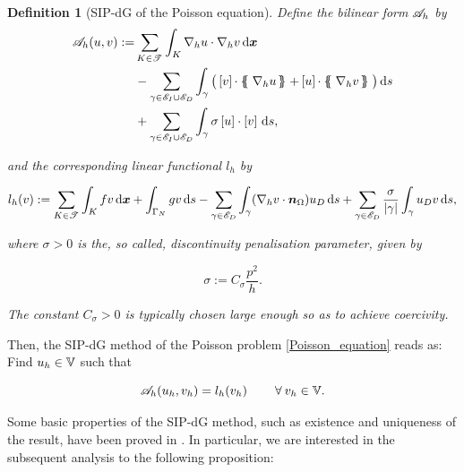 \documentclass[a4paper,11pt]{article}
\newtheorem{definition}{Definition}[section]
\begin{document}
\begin{definition}[SIP-dG of the Poisson equation] \label{def:SIPG}
Define the bilinear form $\mathscr A_{h}$ by
\begin{equation}
\begin{split}
  \cA_{h}(u,v) := &\sum_{K \in \T{}} \int_{K} \nabla_{h} u \cdot \nabla_{h} v \d \vec{x} \\
  & - \sum_{\gamma \in \cE_{I}\cup \cE_{D}}\int_{\gamma} \big( \jump{v} \cdot \avg{\nabla_{h}u} + \jump{u} \cdot \avg{\nabla_{h}v} \big) \d s  \\  
  & + \sum_{\gamma \in \cE_{I}\cup \cE_{D}} \int_{\gamma} \sigma \jump{u} \cdot \jump{v} \d s,
\end{split}
\label{bilinear_form_discrete}
\end{equation}

and the corresponding linear functional $l_{h}$ by

\begin{equation}
    l_{h}(v) := \sum_{K \in \mathscr T^{}} \int_{K} f v \,\mathrm{d} \boldsymbol x + \int_{\Gamma_{N}}gv \,\mathrm{d} s - \sum_{\gamma \in \mathscr E_{D}}\int_{\gamma} (\nabla_{h}v \cdot \boldsymbol n_{\Omega}) u_{D} \,\mathrm{d} s + \sum_{\gamma \in \mathscr E_{D}} \frac{\sigma}{|\gamma|} \int_{\gamma} u_{D} v \,\mathrm{d} s,
\end{equation}

where $\sigma > 0$ is the, so called, \textit{discontinuity penalisation parameter}, given by

\begin{equation}
    \sigma := C_{\sigma} \frac{p^{2}}{h}.
\end{equation}

The constant $C_{\sigma} > 0$ is typically chosen large enough so as to achieve coercivity.

\end{definition}

Then, the SIP-dG method of the Poisson problem \eqref{Poisson_equation} reads as: Find $u_{h} \in \mathbb V$ such that

\begin{equation}
    \mathscr A_{h}(u_{h},v_{h}) = l_{h}(v_{h}) \quad \quad\:\forall\: v_{h} \in \mathbb V.
\label{eq:SIPDG_discrete}
\end{equation}

Some basic properties of the SIP-dG method, such as existence and uniqueness of the result, have been proved in \cite{Wihler:2003}. In particular, we are interested in the subsequent analysis to the following proposition: 
\end{document}
